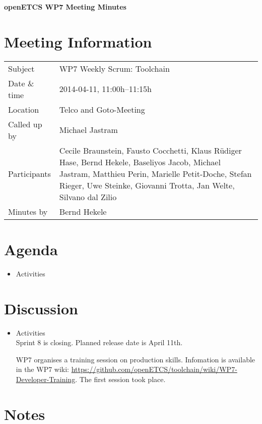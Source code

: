 \documentclass[a4paper, 11pt]{article}
\begin{document}
{\begin{center}\huge\bf openETCS WP7 Meeting Minutes\end{center}}
\section{Meeting Information}

\renewcommand{\arraystretch}{1.5}
\begin{supertabular}{m{.2\textwidth}m{.8\textwidth}}
Subject & WP7 Weekly Scrum: Toolchain\\
Date \& time & 2014-04-11, 11:00h--11:15h\\
Location & Telco and Goto-Meeting\\
Called up by & Michael Jastram\\
Participants &
Cecile Braunstein,
Fausto Cocchetti,
Klaus R\"udiger Hase,
Bernd Hekele,
Baseliyos Jacob,
Michael Jastram,
Matthieu Perin,
Marielle Petit-Doche,
Stefan Rieger,
Uwe Steinke,
Giovanni Trotta,
Jan Welte,
Silvano dal Zilio
\\

Minutes by & Bernd Hekele\\

\end{supertabular}
\renewcommand{\arraystretch}{1.0}


\section{Agenda}
\begin{itemize}
\item Activities
\end{itemize}

\section{Discussion}

\begin{itemize}
\item Activities\\
Sprint 8 is closing. Planned release date is April 11th.

WP7 organises a training session on production skills. Infomation is available in the WP7 wiki: \url{https://github.com/openETCS/toolchain/wiki/WP7-Developer-Training}. The first session took place.

\end{itemize}

\section{Notes}
\end{document}

